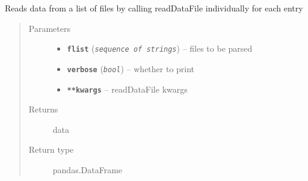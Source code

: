 \documentclass[a4paper,10pt,oneside]{sphinxmanual}
\begin{document}

\begin{fulllineitems}
\label{pymicra:pymicra.io.readDataFiles}
Reads data from a list of files by calling readDataFile individually for each entry
\begin{quote}\begin{description}
\item[{Parameters}] \leavevmode\begin{itemize}
\item {} 
\textbf{\texttt{flist}} (\emph{\texttt{sequence of strings}}) -- files to be parsed

\item {} 
\textbf{\texttt{verbose}} (\emph{\texttt{bool}}) -- whether to print

\item {} 
\textbf{\texttt{**kwargs}} -- readDataFile kwargs

\end{itemize}

\item[{Returns}] \leavevmode
data

\item[{Return type}] \leavevmode
pandas.DataFrame

\end{description}\end{quote}

\end{fulllineitems}

\end{document}
